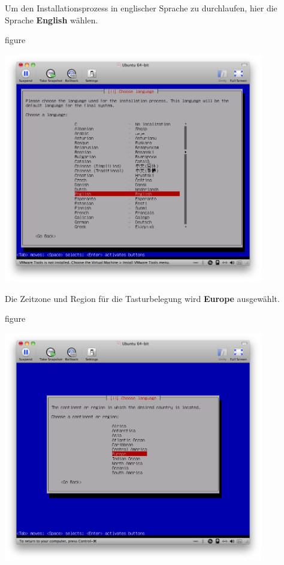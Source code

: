 Um den Installationsprozess in englischer Sprache zu durchlaufen, hier die
Sprache \textbf{English} wählen.

\begin{nofloat}{figure}
\begin{center}
\includegraphics[width=0.85\textwidth]{screenshots/03_ubuntu_install.png}
\end{center}
\end{nofloat}

Die Zeitzone und Region für die Tasturbelegung wird \textbf{Europe} ausgewählt.

\begin{nofloat}{figure}
\begin{center}
\includegraphics[width=0.85\textwidth]{screenshots/04_ubuntu_install.png}
\end{center}
\end{nofloat}

